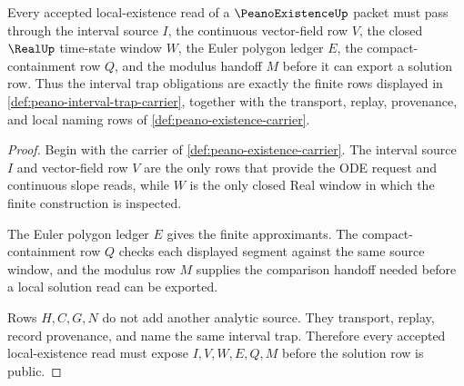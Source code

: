 \begin{theorem}\label{thm:peano-interval-trap-obligations}
Every accepted local-existence read of a $\PeanoExistenceUp$ packet must pass through the interval source $I$, the continuous vector-field row $V$, the closed $\RealUp$ time-state window $W$, the Euler polygon ledger $E$, the compact-containment row $Q$, and the modulus handoff $M$ before it can export a solution row. Thus the interval trap obligations are exactly the finite rows displayed in \autoref{def:peano-interval-trap-carrier}, together with the transport, replay, provenance, and local naming rows of \autoref{def:peano-existence-carrier}.
\end{theorem}
\begin{proof}
Begin with the carrier of \autoref{def:peano-existence-carrier}. The interval source $I$ and vector-field row $V$ are the only rows that provide the ODE request and continuous slope reads, while $W$ is the only closed Real window in which the finite construction is inspected.

The Euler polygon ledger $E$ gives the finite approximants. The compact-containment row $Q$ checks each displayed segment against the same source window, and the modulus row $M$ supplies the comparison handoff needed before a local solution read can be exported.

Rows $H,C,G,N$ do not add another analytic source. They transport, replay, record provenance, and name the same interval trap. Therefore every accepted local-existence read must expose $I,V,W,E,Q,M$ before the solution row is public.
\end{proof}

